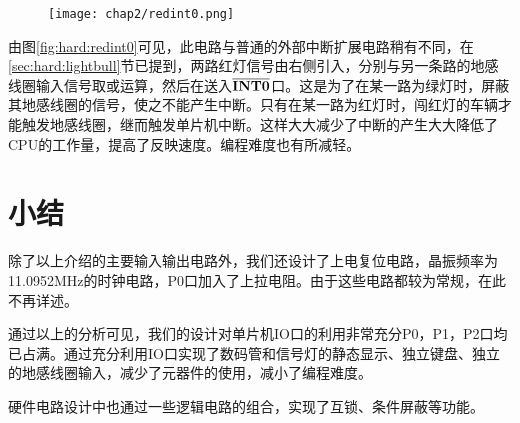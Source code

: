 	\begin{figure}[!tbh]
	\centering
	\texttt{[image: chap2/redint0.png]}
	\end{figure}
	
	由图\ref{fig:hard:redint0}可见，此电路与普通的外部中断扩展电路稍有不同，在\ref{sec:hard:lightbull}节已提到，两路红灯信号由右侧引入，分别与另一条路的地感线圈输入信号取或运算，然后在送入$\bf \overline{INT0}$口。这是为了在某一路为绿灯时，屏蔽其地感线圈的信号，使之不能产生中断。只有在某一路为红灯时，闯红灯的车辆才能触发地感线圈，继而触发单片机中断。这样大大减少了中断的产生大大降低了CPU的工作量，提高了反映速度。编程难度也有所减轻。

\section{小结}
除了以上介绍的主要输入输出电路外，我们还设计了上电复位电路，晶振频率为11.0952MHz的时钟电路，P0口加入了上拉电阻。由于这些电路都较为常规，在此不再详述。

通过以上的分析可见，我们的设计对单片机IO口的利用非常充分P0，P1，P2口均已占满。通过充分利用IO口实现了数码管和信号灯的静态显示、独立键盘、独立的地感线圈输入，减少了元器件的使用，减小了编程难度。

硬件电路设计中也通过一些逻辑电路的组合，实现了互锁、条件屏蔽等功能。
